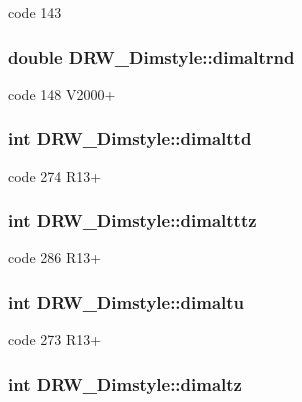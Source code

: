 code 143 \hypertarget{classDRW__Dimstyle_a023f32391a544dc81aabadd2e163f90d}{
\subsubsection[{dimaltrnd}]{\setlength{\rightskip}{0pt plus 5cm}double D\-R\-W\-\_\-\-Dimstyle\-::dimaltrnd}}\label{classDRW__Dimstyle_a023f32391a544dc81aabadd2e163f90d}
code 148 V2000+ \hypertarget{classDRW__Dimstyle_a3856be49d2e138cc1c6605ae1bf7b14a}{
\subsubsection[{dimalttd}]{\setlength{\rightskip}{0pt plus 5cm}int D\-R\-W\-\_\-\-Dimstyle\-::dimalttd}}\label{classDRW__Dimstyle_a3856be49d2e138cc1c6605ae1bf7b14a}
code 274 R13+ \hypertarget{classDRW__Dimstyle_af4c0b630cd4485a16cafe42ddcda6b0a}{
\subsubsection[{dimaltttz}]{\setlength{\rightskip}{0pt plus 5cm}int D\-R\-W\-\_\-\-Dimstyle\-::dimaltttz}}\label{classDRW__Dimstyle_af4c0b630cd4485a16cafe42ddcda6b0a}
code 286 R13+ \hypertarget{classDRW__Dimstyle_afa6555bf1abbabe03f6a48a9b8e1026c}{
\subsubsection[{dimaltu}]{\setlength{\rightskip}{0pt plus 5cm}int D\-R\-W\-\_\-\-Dimstyle\-::dimaltu}}\label{classDRW__Dimstyle_afa6555bf1abbabe03f6a48a9b8e1026c}
code 273 R13+ \hypertarget{classDRW__Dimstyle_a841079cef255e9f6d06d7b97a28c67ec}{
\subsubsection[{dimaltz}]{\setlength{\rightskip}{0pt plus 5cm}int D\-R\-W\-\_\-\-Dimstyle\-::dimaltz}}\label{classDRW__Dimstyle_a841079cef255e9f6d06d7b97a28c67ec}

